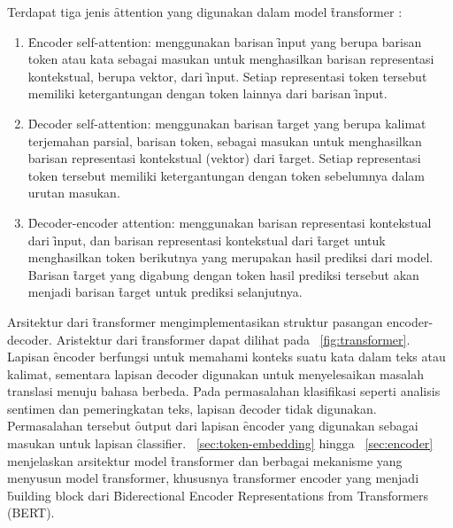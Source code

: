 	Terdapat tiga jenis \f{attention} yang digunakan dalam model \f{transformer} \citep{transformerori}:
	\begin{enumerate}
		\item \f{Encoder self-attention}: menggunakan barisan \f{input} yang berupa barisan token atau kata sebagai masukan untuk menghasilkan barisan representasi kontekstual, berupa vektor, dari \f{input}. Setiap representasi token tersebut memiliki ketergantungan dengan token lainnya dari barisan \f{input}.
		\item \f{Decoder self-attention}: menggunakan barisan \f{target} yang berupa kalimat terjemahan parsial, barisan token, sebagai masukan untuk menghasilkan barisan representasi kontekstual (vektor) dari \f{target}. Setiap representasi token tersebut memiliki ketergantungan dengan token sebelumnya dalam urutan masukan.
		\item \f{Decoder-encoder attention}: menggunakan barisan representasi kontekstual dari \f{input}, dan barisan representasi kontekstual dari \f{target} untuk menghasilkan token berikutnya yang merupakan hasil prediksi dari model. Barisan \f{target} yang digabung dengan token hasil prediksi tersebut akan menjadi barisan \f{target} untuk prediksi selanjutnya.
	\end{enumerate}
	Arsitektur dari \f{transformer} mengimplementasikan struktur pasangan encoder-decoder. Aristektur dari \f{transformer} dapat dilihat pada \pic~\ref{fig:transformer}. Lapisan \f{encoder} berfungsi untuk memahami konteks suatu kata dalam teks atau kalimat, sementara lapisan \f{decoder} digunakan untuk menyelesaikan masalah translasi menuju bahasa berbeda. Pada permasalahan klasifikasi seperti analisis sentimen dan pemeringkatan teks, lapisan \f{decoder} tidak digunakan. Permasalahan tersebut \f{output} dari lapisan \f{encoder} yang digunakan sebagai masukan untuk lapisan \f{classifier}. \sect~\ref{sec:token-embedding} hingga \sect~\ref{sec:encoder} menjelaskan arsitektur model \f{transformer} dan berbagai mekanisme yang menyusun model \f{transformer}, khususnya \f{transformer encoder} yang menjadi \f{building block} dari \f{Biderectional Encoder Representations from Transformers} (BERT).

